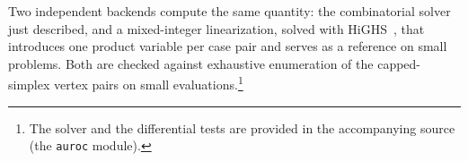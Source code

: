 \documentclass[11pt]{article}
\theoremstyle{remark}
\begin{document}
Two independent backends compute the same quantity: the combinatorial solver
just described, and a mixed-integer linearization, solved with HiGHS~\cite{huangfu2018highs},
that introduces one product variable per case pair and serves as a reference on
small problems. Both are checked against exhaustive enumeration of
the capped-simplex vertex pairs on small evaluations.\footnote{The solver and
the differential tests are provided in the accompanying source (the
\texttt{auroc} module).}
\end{document}
